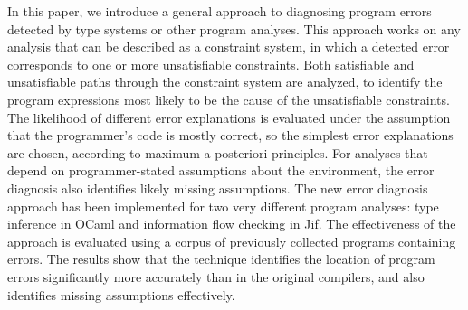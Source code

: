 In this paper, we introduce a general approach to diagnosing
program errors detected by type systems or other program analyses.
This approach works on any analysis that can be described as a
constraint system, in which a detected error corresponds to one or
more unsatisfiable constraints.  Both satisfiable and unsatisfiable
paths through the constraint system are analyzed, to identify the
program expressions most likely to be the cause of the unsatisfiable
constraints. The likelihood of different error explanations is
evaluated under the assumption that the programmer's code is mostly
correct, so the simplest error explanations are chosen, according to
maximum a posteriori principles. For analyses that depend on
programmer-stated assumptions about the environment, the error
diagnosis also identifies likely missing assumptions.  The new error
diagnosis approach has been implemented for two very different program
analyses: type inference in OCaml and information flow checking in
Jif. The effectiveness of the approach is evaluated using a corpus of
previously collected programs containing errors. The results show that
the technique identifies the location of program errors significantly
more accurately than in the original compilers, and also identifies
missing assumptions effectively.
